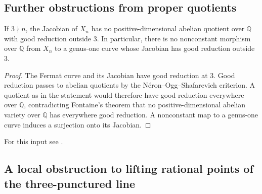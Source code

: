 \subsection{Further obstructions from proper quotients}

\begin{proposition}
\label{prop:lm-no-good-outside-three-quotient}
If $3\nmid n$, the Jacobian of $X_n$ has no positive-dimensional
abelian quotient over $\mathbb Q$ with good reduction outside
$3$.  In particular, there is no nonconstant morphism over
$\mathbb Q$ from $X_n$ to a genus-one curve whose Jacobian has
good reduction outside $3$.
\end{proposition}
\begin{proof}
The Fermat curve and its Jacobian have good reduction at $3$.
Good reduction passes to abelian quotients by the
N\'eron--Ogg--Shafarevich criterion.  A quotient as in the
statement would therefore have good reduction everywhere
over $\mathbb Q$, contradicting Fontaine's theorem that no
positive-dimensional abelian variety over $\mathbb Q$ has
everywhere good reduction.  A nonconstant map to a
genus-one curve induces a surjection onto its Jacobian.
\end{proof}

For this input see \citet[Corollary, p.~517]{Fontaine1985}.

\subsection{A local obstruction to lifting rational points of the three-punctured line}
\label{subsec:lm-local-metabelian-separation}

